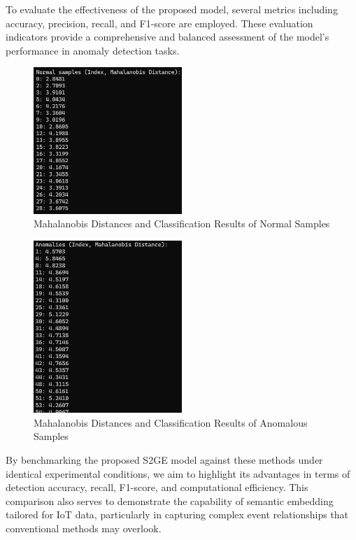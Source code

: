 \begin{ZhChapter}
    To evaluate the effectiveness of the proposed model, several metrics including accuracy, precision, recall, and F1-score are employed. These evaluation indicators provide a comprehensive and balanced assessment of the model's performance in anomaly detection tasks.





    \begin{figure}[htbp]
        \centering
        \includegraphics[width = 0.5\textwidth]{image/NormalSample.jpg}
        \caption{Mahalanobis Distances and Classification Results of Normal Samples}
        \label{fig:NS}
    \end{figure}


    \begin{figure}[htbp]
        \centering
        \includegraphics[width = 0.5\textwidth]{image/AbnormalSample.jpg}
        \caption{Mahalanobis Distances and Classification Results of Anomalous Samples}
        \label{fig:AS}
    \end{figure}



    \newpage
    By benchmarking the proposed S2GE model against these methods under identical experimental conditions, we aim to highlight its advantages in terms of detection accuracy, recall, F1-score, and computational efficiency. This comparison also serves to demonstrate the capability of semantic embedding tailored for IoT data, particularly in capturing complex event relationships that conventional methods may overlook.



\end{ZhChapter}
